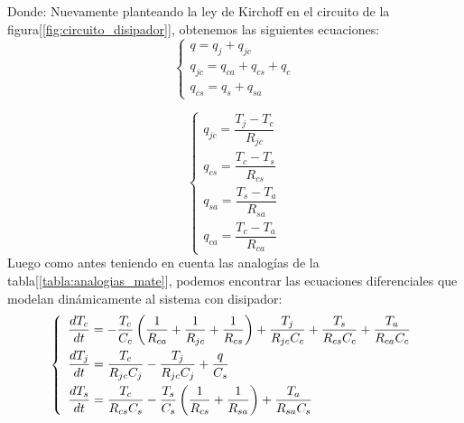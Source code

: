 \documentclass[10pt]{article}
\begin{document}
Donde:
Nuevamente planteando la ley de Kirchoff en el circuito de la figura[\ref{fig:circuito_disipador}], obtenemos las siguientes ecuaciones:
\begin{equation}
\label{eq:nodos_disipador}
   \left\{
      \begin{array}{ll}
         q=q_{j}+q_{jc}\\[10pt]
         q_{jc}=q_{ca}+q_{cs}+q_{c}\\[10pt]
         q_{cs}=q_s+q_{sa}
      \end{array}
   \right.
\end{equation}

\begin{equation}
\label{eq:nodos_disipador2}
   \left\{
      \begin{array}{ll}
         q_{jc}=\dfrac{T_j-T_c}{R_{jc}}\\[10pt]
         q_{cs}=\dfrac{T_c-T_s}{R_{cs}}\\[10pt]
         q_{sa}=\dfrac{T_s-T_a}{R_{sa}}\\[10pt]
         q_{ca}=\dfrac{T_c-T_a}{R_{ca}}
      \end{array}
   \right.
\end{equation}
Luego como antes teniendo en cuenta las analogías de la tabla[\ref{tabla:analogias_mate}], podemos encontrar las ecuaciones diferenciales que modelan dinámicamente
al sistema con disipador:
\begin{equation}
\medskip
\label{eq:diferenciales_disipador}
   \left\{
      \begin{array}{ll}
         \dfrac{dT_{c}}{dt}=-\dfrac{T_{c}}{C_{c}} \left(\dfrac{1}{R_{ca}} + \dfrac{1}{R_{jc}} +\dfrac{1}{R_{cs}}\right) + \dfrac{T_{j}}{R_{jc}C_{c}} + \dfrac{T_{s}}{R_{cs}C_{c}} + \dfrac{T_{a}}{R_{ca}C_{c}} \\[10pt]
         \dfrac{dT_{j}}{dt}=\dfrac{T_{c}}{R_{jc}C_{j}} - \dfrac{T_{j}}{R_{jc}C_{j}} + \dfrac{q}{C_{s}}\\[10pt]
         \dfrac{dT_{s}}{dt}=\dfrac{T_{c}}{R_{cs}C_{s}} - \dfrac{T_{s}}{C_{s}}\left( \dfrac{1}{R_{cs}} + \dfrac{1}{R_{sa}}\right) + \dfrac{T_{a}}{R_{sa}C_{s}}
      \end{array}
   \right.
\end{equation}
\end{document}
